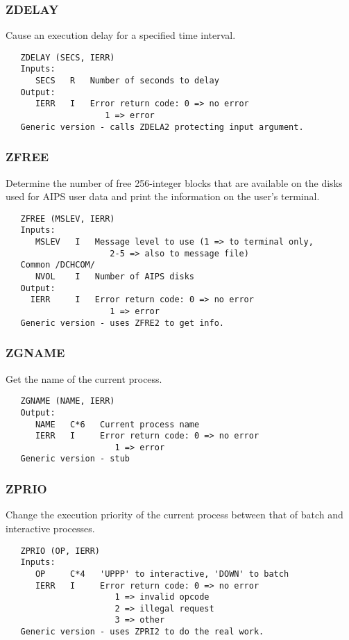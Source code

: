 \subsubsection{ZDELAY}
Cause an execution delay for a specified time interval.
\begin{verbatim}
   ZDELAY (SECS, IERR)
   Inputs:
      SECS   R   Number of seconds to delay
   Output:
      IERR   I   Error return code: 0 => no error
                    1 => error
   Generic version - calls ZDELA2 protecting input argument.
\end{verbatim}

\subsubsection{ZFREE}
Determine the number of free 256-integer blocks that are available
on the disks used for AIPS user data and print the information on
the user's terminal.
\begin{verbatim}
   ZFREE (MSLEV, IERR)
   Inputs:
      MSLEV   I   Message level to use (1 => to terminal only,
                     2-5 => also to message file)
   Common /DCHCOM/
      NVOL    I   Number of AIPS disks
   Output:
     IERR     I   Error return code: 0 => no error
                     1 => error
   Generic version - uses ZFRE2 to get info.
\end{verbatim}

\subsubsection{ZGNAME}
Get the name of the current process.
\begin{verbatim}
   ZGNAME (NAME, IERR)
   Output:
      NAME   C*6   Current process name
      IERR   I     Error return code: 0 => no error
                      1 => error
   Generic version - stub
\end{verbatim}

\subsubsection{ZPRIO}
Change the execution priority of the current process between that of
batch and interactive processes.
\begin{verbatim}
   ZPRIO (OP, IERR)
   Inputs:
      OP     C*4   'UPPP' to interactive, 'DOWN' to batch
      IERR   I     Error return code: 0 => no error
                      1 => invalid opcode
                      2 => illegal request
                      3 => other
   Generic version - uses ZPRI2 to do the real work.
\end{verbatim}

